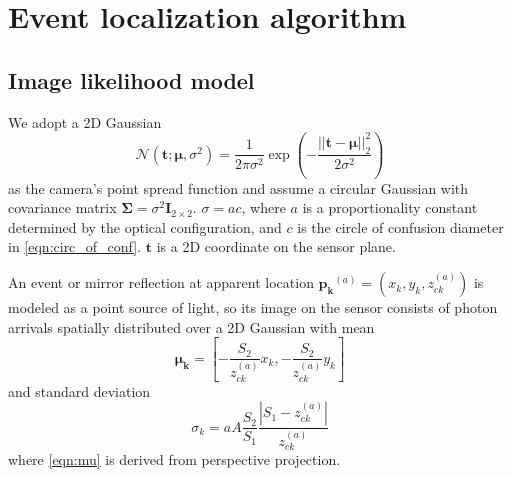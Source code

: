 \section{Event localization algorithm}

\subsection{Image likelihood model}

We adopt a 2D Gaussian 
\begin{equation}
\mathcal{N}(\bm{t};\bm{\mu},\sigma^2)=\frac{1}{2\pi\sigma^2}\exp\left({-\frac{||\bm{t}-\bm{\mu}||_2^2}{2\sigma^2}}\right) 
\end{equation}
as the camera's point spread function and assume a circular Gaussian with 
covariance matrix $\bm{\Sigma}=\sigma^2 \bm{I}_{2\times2}$. 
$\sigma=ac$, where $a$ is a proportionality constant determined by the 
optical configuration, and $c$ is the circle of confusion diameter in \cref{eqn:circ_of_conf}.
$\bm{t}$ is a 2D coordinate on the sensor plane.

An event or mirror reflection at apparent location 
$\bm{p_k}^{(a)}=(x_k,y_k,z_{ck}^{(a)})$ is modeled as 
a point source of light, so its image on the sensor consists of photon arrivals 
spatially distributed over a 2D Gaussian with mean 
\begin{equation} \label{eqn:mu}
\bm{\mu_k}=\left[ -\frac{S_2}{z_{ck}^{(a)}}x_k, -\frac{S_2}{z_{ck}^{(a)}}y_k \right]
\end{equation}
and standard deviation 
\begin{equation} \label{eqn:stdev}
\sigma_k=aA\frac{S_2}{S_1}\frac{|S_1-z_{ck}^{(a)}|}{z_{ck}^{(a)}}
\end{equation}
where \cref{eqn:mu} is derived from perspective projection.

